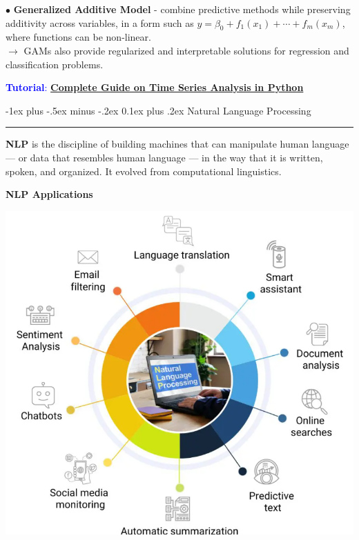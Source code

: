 \documentclass[letterpaper, 10.5pt,landscape]{article}
\makeatletter
\renewcommand{\section}{\@startsection{section}{1}{0mm}%
                                {-1ex plus -.5ex minus -.2ex}%
                                {0.1ex plus .2ex}%
                                {\normalfont\small}}
\makeatother
\begin{document}
\begin{multicols*}{3}
$\bullet$ \textbf{Generalized Additive Model} - combine predictive methods while preserving additivity across variables, in a form such as
$y = \beta_0 + f_1(x_1) + \cdots + f_m(x_m)$, where functions can be non-linear. \\
$\rightarrow$ GAMs also provide regularized and interpretable solutions for regression and classification problems.


\vspace{5pt}
\textcolor{blue}{\textbf{Tutorial}:} \href{https://www.kaggle.com/code/prashant111/complete-guide-on-time-series-analysis-in-python}{\textbf{Complete Guide on Time Series Analysis in Python}}




\vspace*{\fill}

\columnbreak

\section{Natural Language Processing} {\color{teal}\hrule height 1pt} \smallskip


\textbf{NLP} is the discipline of building machines that can manipulate human language — or data that resembles human language — in the way that it is written, spoken, and organized. It evolved from computational linguistics.


\textbf{NLP Applications}
\vspace{-7pt}
\begin{center}
    \begin{minipage}{0.86\linewidth}
    \includegraphics[width=\textwidth]{figures/nlp_application.png}
    \end{minipage}
\end{center}
\vspace{-7pt}




\end{multicols*}
\end{document}
